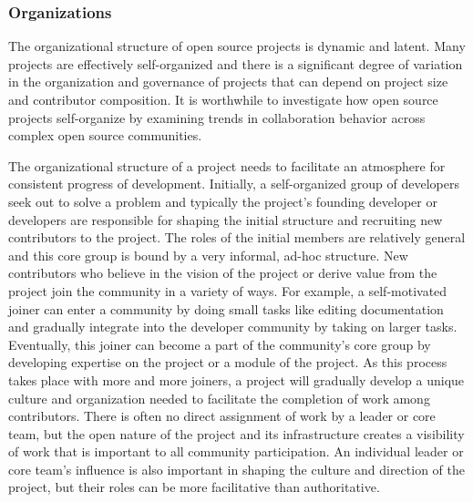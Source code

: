 \subsubsection{Organizations}

The organizational structure of open source projects is dynamic and latent. Many projects are effectively self-organized and there is a significant degree of variation in the organization and governance of projects that can depend on project size and contributor composition. It is worthwhile to investigate how open source projects self-organize by examining trends in collaboration behavior across complex open source communities.

The organizational structure of a project needs to facilitate an atmosphere for consistent progress of development. Initially, a self-organized group of developers seek out to solve a problem and typically the project's founding developer or developers are responsible for shaping the initial structure and recruiting new contributors to the project. The roles of the initial members are relatively general and this core group is bound by a very informal, ad-hoc structure. New contributors who believe in the vision of the project or derive value from the project join the community in a variety of ways. For example, a self-motivated joiner can enter a community by doing small tasks like editing documentation and gradually integrate into the developer community by taking on larger tasks. Eventually, this joiner can become a part of the community's core group by developing expertise on the project or a module of the project. As this process takes place with more and more joiners, a project will gradually develop a unique culture and organization needed to facilitate the completion of work among contributors. There is often no direct assignment of work by a leader or core team, but the open nature of the project and its infrastructure creates a visibility of work that is important to all community participation. An individual leader or core team's influence is also important in shaping the culture and direction of the project, but their roles can be more facilitative than authoritative.
